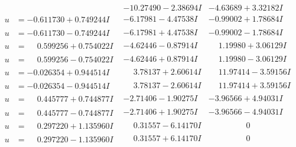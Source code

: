 \documentclass[1p]{elsarticle_modified}
\theoremstyle{definition}
\begin{document}
$$\begin{array}{c|c|c}
 & -10.27490 - 2.38694 I & -4.63689 + 3.32182 I \\ \hline\begin{aligned}
u &= -0.611730 + 0.749244 I\end{aligned}
 & -6.17981 - 4.47538 I & -0.99002 + 1.78684 I \\ \hline\begin{aligned}
u &= -0.611730 - 0.749244 I\end{aligned}
 & -6.17981 + 4.47538 I & -0.99002 - 1.78684 I \\ \hline\begin{aligned}
u &= \phantom{-}0.599256 + 0.754022 I\end{aligned}
 & -4.62446 - 0.87914 I & \phantom{-}1.19980 + 3.06129 I \\ \hline\begin{aligned}
u &= \phantom{-}0.599256 - 0.754022 I\end{aligned}
 & -4.62446 + 0.87914 I & \phantom{-}1.19980 - 3.06129 I \\ \hline\begin{aligned}
u &= -0.026354 + 0.944514 I\end{aligned}
 & \phantom{-}3.78137 + 2.60614 I & \phantom{-}11.97414 - 3.59156 I \\ \hline\begin{aligned}
u &= -0.026354 - 0.944514 I\end{aligned}
 & \phantom{-}3.78137 - 2.60614 I & \phantom{-}11.97414 + 3.59156 I \\ \hline\begin{aligned}
u &= \phantom{-}0.445777 + 0.744877 I\end{aligned}
 & -2.71406 - 1.90275 I & -3.96566 + 4.94031 I \\ \hline\begin{aligned}
u &= \phantom{-}0.445777 - 0.744877 I\end{aligned}
 & -2.71406 + 1.90275 I & -3.96566 - 4.94031 I \\ \hline\begin{aligned}
u &= \phantom{-}0.297220 + 1.135960 I\end{aligned}
 & \phantom{-}0.31557 - 6.14170 I & \phantom{-0.000000 } 0 \\ \hline\begin{aligned}
u &= \phantom{-}0.297220 - 1.135960 I\end{aligned}
 & \phantom{-}0.31557 + 6.14170 I & \phantom{-0.000000 } 0 \\ \hline\begin{aligned}

\end{aligned}
\end{array}$$
\end{document}
